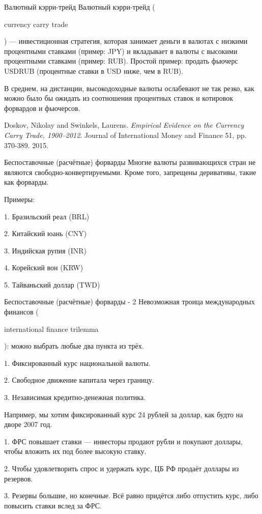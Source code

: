 \documentclass{beamer}
\newcommand{\en}[1]{\begin{otherlanguage}{english}#1\end{otherlanguage}}
\begin{document}
\begin{frame}{Валютный кэрри-трейд}
\justify
\alert{Валютный кэрри-трейд} (\en{currency carry trade}) --- инвестиционная стратегия, которая занимает деньги в валютах с низкими процентными ставками (пример: JPY) и вкладывает в валюты с высокими процентными ставками (пример: RUB). Простой пример: продать фьючерс USDRUB (процентные ставки в USD ниже, чем в RUB).

\justify
В среднем, на дистанции, высокодоходные валюты ослабевают не так резко, как можно было бы ожидать из соотношения процентных ставок и котировок форвардов и фьючерсов.

\justify
\en{Doskov, Nikolay and Swinkels, Laurens. \textit{Empirical Evidence on the Currency Carry Trade, 1900--2012}. Journal of International Money and Finance 51, pp. 370-389. 2015.}

\end{frame}



\begin{frame}{Беспоставочные (расчётные) форварды}
\justify
Многие валюты развивающихся стран не являются свободно-конвертируемыми. Кроме того, запрещены деривативы, такие как форварды.

\justify
Примеры:

1. Бразильский реал (BRL)

2. Китайский юань (CNY)

3. Индийская рупия (INR)

4. Корейский вон (KRW)

5. Тайваньский доллар (TWD)
\end{frame}



\begin{frame}{Беспоставочные (расчётные) форварды - 2}
\justify
Невозможная троица международных финансов (\en{international finance trilemma}): можно выбрать любые два пункта из трёх.

1. Фиксированный курс национальной валюты.

2. Свободное движение капитала через границу.

3. Независимая кредитно-денежная политика.

\justify
Например, мы хотим фиксированный курс 24 рублей за доллар, как будто на дворе 2007 год.

1. ФРС повышает ставки --- инвесторы продают рубли и покупают доллары, чтобы вложить их под более высокую ставку.

2. Чтобы удовлетворить спрос и удержать курс, ЦБ РФ продаёт доллары из резервов.

3. Резервы большие, но конечные. Всё равно придётся либо отпустить курс, либо повысить ставки вслед за ФРС.

\end{frame}
\end{document}
